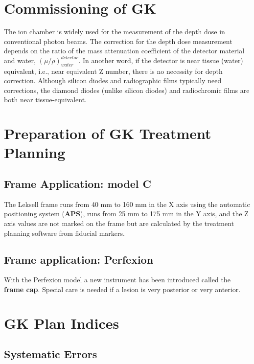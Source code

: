 \documentclass[]{book}
\theoremstyle{definition}
\theoremstyle{definition}
\theoremstyle{definition}
\theoremstyle{remark}
\begin{document}
\section{Commissioning of GK}\label{commissioning-of-gk}

The ion chamber is widely used for the measurement of the depth dose in
conventional photon beams. The correction for the depth dose measurement
depends on the ratio of the mass attenuation coefficient of the detector
material and water, \(\left( \mu/\rho \right )^{detector}_{water}\). In
another word, if the detector is near tissue (water) equivalent, i.e.,
near equivalent Z number, there is no necessity for depth correction.
Although silicon diodes and radiographic films typically need
corrections, the diamond diodes (unlike silicon diodes) and radiochromic
films are both near tissue-equivalent.

\section{Preparation of GK Treatment
Planning}\label{preparation-of-gk-treatment-planning}

\subsection{Frame Application: model C}\label{frame-application-model-c}

The Leksell frame runs from 40 mm to 160 mm in the X axis using the
automatic positioning system (\textbf{APS}), runs from 25 mm to 175 mm
in the Y axis, and the Z axis values are not marked on the frame but are
calculated by the treatment planning software from fiducial markers.

\subsection{Frame application:
Perfexion}\label{frame-application-perfexion}

With the Perfexion model a new instrument has been introduced called the
\textbf{frame cap}. Special care is needed if a lesion is very posterior
or very anterior.

\section{GK Plan Indices}\label{gk-plan-indices}

\subsection{Systematic Errors}\label{systematic-errors}
\end{document}
